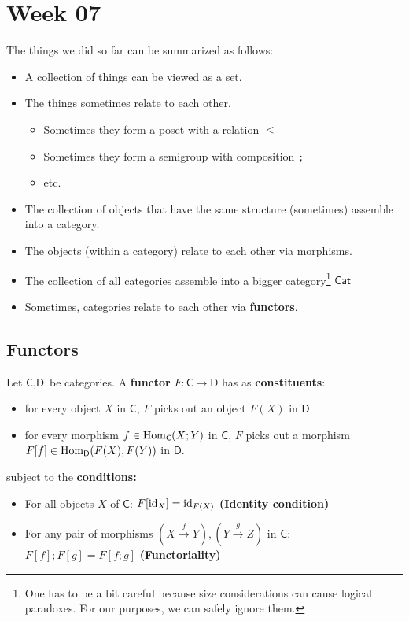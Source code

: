 \section{Week 07}

The things we did so far can be summarized as follows:
\begin{itemize}
  \item A collection of things can be viewed as a set.
  \item The things sometimes relate to each other. 
    \begin{itemize}
      \item Sometimes they form a poset with a relation $\leq$
      \item Sometimes they form a semigroup with composition \texttt{;}
      \item etc.
    \end{itemize}
  \item The collection of objects that have the same structure (sometimes) assemble into a category.
  \item The objects (within a category) relate to each other via morphisms.
  \item The collection of all categories assemble into a bigger category\footnote{One has to be a bit careful because size considerations can cause logical paradoxes. For our purposes, we can safely ignore them.} $\textsf{Cat}$
  \item Sometimes, categories relate to each other via \textbf{functors}.
\end{itemize}


\subsection{Functors}
Let $\textsf{C},\textsf{D}$ be categories. A \textbf{functor} $F: \textsf{C} \to \textsf{D}$ has as \textbf{constituents}:
\begin{itemize}
  \item for every object $X$ in $\textsf{C}$, $F$ picks out an object $F(X)$ in $\textsf{D}$
  \item for every morphism $f \in \operatorname{Hom}_{\textsf{C}}(X;Y)$ in $\textsf{C}$, $F$ picks out a morphism $F[f] \in \operatorname{Hom}_{\textsf{D}}(F(X),F(Y))$ in $\textsf{D}$.
\end{itemize}
subject to the \textbf{conditions:}
\begin{itemize}
  \item For all objects $X$ of $\textsf{C}$: $F[\operatorname{id}_X] = \operatorname{id}_{F(X)}$
    \hfill
    \textbf{(Identity condition)}
  \item For any pair of morphisms $(X \stackrel{f}{\to}Y), (Y \stackrel{g}{\to}Z)$ in $\textsf{C}$: $F[f];F[g] = F[f;g]$
    \hfill
    \textbf{(Functoriality)}
\end{itemize}


